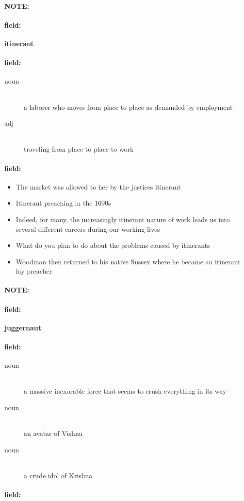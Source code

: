 \documentclass[12pt]{article}
\newenvironment{note}{\paragraph{NOTE:}}{}
\newenvironment{field}{\paragraph{field:}}{}
\begin{document}
\begin{note}
\begin{field}
\textbf{\large itinerant}
\end{field}


\begin{field}
\begin{description}
\item[noun] \hfill \\ 
a laborer who moves from place to place as demanded by employment

\item[adj] \hfill \\ 
traveling from place to place to work

\end{description}
\end{field}

\begin{field}
\begin{itemize}
\item The market was allowed to her by the justices itinerant
\item Itinerant preaching in the 1690s
\item Indeed, for many, the increasingly itinerant nature of work leads us into several different careers during our working lives
\item What do you plan to do about the problems caused by itinerants
\item Woodman then returned to his native Sussex where he became an itinerant lay preacher
\end{itemize}
\end{field}
\end{note}
\begin{note}
\begin{field}
\textbf{\large juggernaut}
\end{field}


\begin{field}
\begin{description}
\item[noun] \hfill \\ 
a massive inexorable force that seems to crush everything in its way

\item[noun] \hfill \\ 
an avatar of Vishnu

\item[noun] \hfill \\ 
a crude idol of Krishna

\end{description}
\end{field}

\begin{field}
\end{field}
\end{note}
\end{document}
